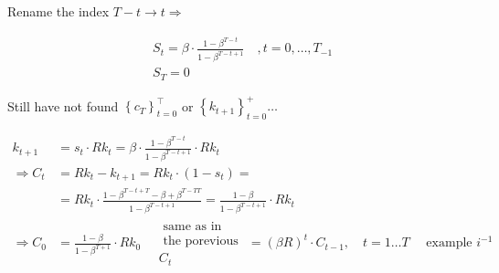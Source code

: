 \documentclass[10pt]{article}
\begin{document}
Rename the index $T-t \rightarrow t \Rightarrow$

$$
\begin{aligned}
& S_{t}=\beta \cdot \frac{1-\beta^{T-t}}{1-\beta^{T-t+1}} \quad, t=0, \ldots, T_{-1} \\
& S_{T}=0
\end{aligned}
$$

Still have not found $\left\{c_{T}\right\}_{t=0}^{\top}$ or $\left\{k_{t+1}\right\}_{t=0}^{+} \ldots$

$$
\begin{aligned}
k_{t+1} & =s_{t} \cdot R k_{t}=\beta \cdot \frac{1-\beta^{T-t}}{1-\beta^{T-t+1}} \cdot R k_{t} \\
\Rightarrow C_{t} & =R k_{t}-k_{t+1}=R k_{t} \cdot\left(1-s_{t}\right)= \\
& =R k_{t} \cdot \frac{1-\beta^{T-t+T}-\beta+\beta^{T-T T}}{1-\beta^{T-t+1}}=\frac{1-\beta}{1-\beta^{T-t+1}} \cdot R k_{t} \\
\Rightarrow C_{0} & =\frac{1-\beta}{1-\beta^{T+1}} \cdot R k_{0} \quad \begin{array}{l}
\text { same as in } \\
\text { the porevious } \\
C_{t}
\end{array}=(\beta R)^{t} \cdot C_{t-1}, \quad t=1 \ldots T \quad \text { example } i^{-1}
\end{aligned}
$$
\end{document}
